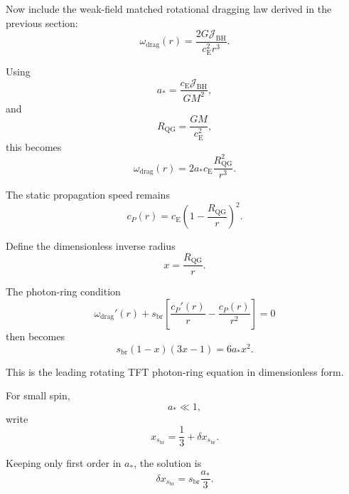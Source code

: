 Now include the weak-field matched rotational dragging law derived in the previous section:
\begin{equation}
    \omega_{\mathrm{drag}}(r) = \frac{2G\mathcal{J}_{\mathrm{BH}}}{c_{\mathrm{E}}^2r^3}.
\end{equation}

Using
\begin{equation}
    a_\ast = \frac{c_{\mathrm{E}}\mathcal{J}_{\mathrm{BH}}}{GM^2},
\end{equation}
and
\begin{equation}
    R_{\mathrm{QG}} = \frac{GM}{c_{\mathrm{E}}^2},
\end{equation}
this becomes
\begin{equation}
    \omega_{\mathrm{drag}}(r) = 2a_\ast c_{\mathrm{E}} \frac{R_{\mathrm{QG}}^2}{r^3}.
\end{equation}

The static propagation speed remains
\begin{equation}
    c_P(r) = c_{\mathrm{E}} \left( 1-\frac{R_{\mathrm{QG}}}{r} \right)^2.
\end{equation}

Define the dimensionless inverse radius
\begin{equation}
    x = \frac{R_{\mathrm{QG}}}{r}.
\end{equation}

The photon-ring condition
\begin{equation}
    \omega_{\mathrm{drag}}'(r) + s_{\mathrm{br}} \left[ \frac{c_P'(r)}{r} - \frac{c_P(r)}{r^2} \right] = 0
\end{equation}
then becomes
\begin{equation}
    \boxed{ s_{\mathrm{br}}(1-x)(3x-1) = 6a_\ast x^2. }
\end{equation}

This is the leading rotating TFT photon-ring equation in dimensionless form.

For small spin,
\begin{equation}
    a_\ast \ll 1,
\end{equation}
write
\begin{equation}
    x_{s_{\mathrm{br}}} = \frac{1}{3} + \delta x_{s_{\mathrm{br}}}.
\end{equation}

Keeping only first order in $a_\ast$, the solution is
\begin{equation}
    \delta x_{s_{\mathrm{br}}} = s_{\mathrm{br}}\frac{a_\ast}{3}.
\end{equation}

